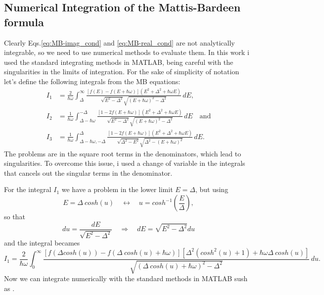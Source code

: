 \documentclass[a4paper,11pt]{book}
\begin{document}
\subsection{Numerical Integration of the Mattis-Bardeen formula}

Clearly Eqs.\ref{eq:MB-imag_cond} and \ref{eq:MB-real_cond} are not analytically integrable, so we need to use numerical methods to evaluate them. 
In this work i used the standard integrating methods in MATLAB, being careful with the singularities in the limits of integration. For the sake of simplicity of notation let's define 
the following integrals from the MB equations:
\begin{align}
I_1 &= \frac{2}{\hbar\omega} \int_{\Delta}^{\infty} \frac{\left[ f(E) - f(E + \hbar\omega) \right] \left( E^2 + \Delta^2 + \hbar\omega E \right)}{\sqrt{E^2 - \Delta^2} \sqrt{(E + \hbar\omega)^2 - \Delta^2}} \, dE , \\
I_2 &= \frac{1}{\hbar\omega} \int_{\Delta -\hbar\omega}^{-\Delta} \frac{\left[ 1 - 2f(E + \hbar\omega) \right] \left( E^2 + \Delta^2 + \hbar\omega E \right)}{\sqrt{E^2 - \Delta^2} \sqrt{(E + \hbar\omega)^2 - \Delta^2}} \, dE \quad \text{and} \\
I_3 &= \frac{1}{\hbar\omega} \int_{\Delta - \hbar\omega, -\Delta}^{\Delta} \frac{\left[ 1 - 2f(E + \hbar\omega) \right] \left( E^2 + \Delta^2 + \hbar\omega E \right)}{\sqrt{\Delta^2 - E^2} \sqrt{\Delta^2 - (E + \hbar\omega)^2}} \, dE.
\end{align}
The problems are in the square root terms in the denominators, which lead to singularities. 
To overcome this issue, i used a change of variable in the integrals that cancels out the singular terms in the denominator.


For the integral $I_1$ we have a problem in the lower limit $E= \Delta$, but using 
\[
    E = \Delta~cosh(u) \quad \leftrightarrow \quad u = cosh^{-1}(\frac{E}{\Delta}),
\]
so that
\[
    du = \frac{dE}{\sqrt{E^2 - \Delta^2}} \quad \Rightarrow \quad dE = \sqrt{E^2 - \Delta^2}du
\]
and the integral becames
\begin{equation}
    I_1 = \frac{2}{\hbar\omega} \int_{0}^{\infty} \frac{\left[ f(\Delta cosh(u)) - f(\Delta~cosh(u) + \hbar\omega) \right] \left[ \Delta^2(cosh^2(u) + 1) + \hbar\omega \Delta~cosh(u) \right]}{ \sqrt{(\Delta~cosh(u) + \hbar\omega)^2 - \Delta^2}} \, du .
\end{equation}
Now we can integrate numerically with the standard methods in MATLAB sush as .
\end{document}
